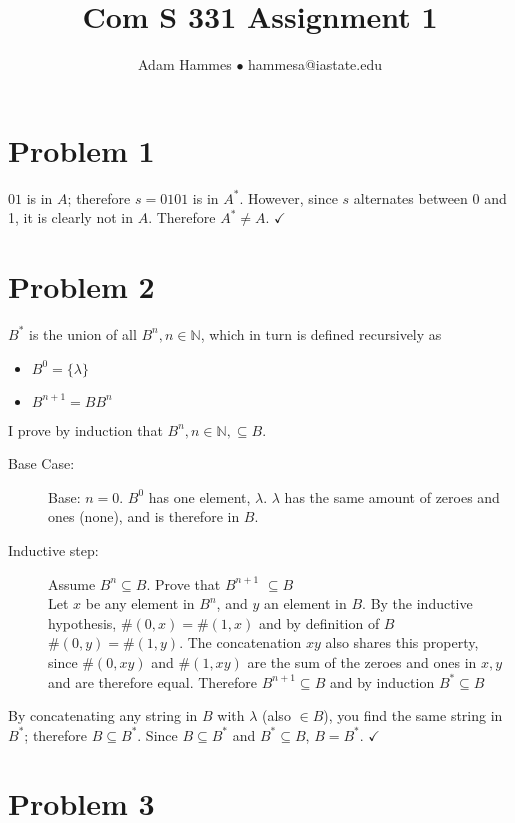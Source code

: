 \documentclass[11pt]{article}
\begin{document}
\title{Com S 331 Assignment 1}
\author{Adam Hammes $\bullet$ hammesa@iastate.edu}
\maketitle

\section*{Problem 1}

$01$ is in $A$; therefore $s = 0101$ is in $A^*$. However, since $s$ alternates between 0 and 1, it is clearly not in $A$. Therefore $A^* \neq A$. $\checkmark$

\section*{Problem 2}
$B^*$ is  the union of all $B^n, n \in \mathbb{N}$, which in turn is defined recursively as
	\begin{itemize}
		\item 		$B^0	= \{\lambda\}$
		\item		$B^{n+1}	 = BB^n$
	\end{itemize}
I prove by induction that $B^n, n \in \mathbb{N}, \subseteq B$.

\begin{description}
	\item[Base Case:] Base: $n = 0$. $B^0$ has one element, $\lambda$. $\lambda$ has the same amount of zeroes and ones (none), and is therefore in $B$.
	
	\item[Inductive step:] Assume $B^n \subseteq B$. Prove that $B^{n+1}$ $\subseteq B$\\
	Let $x$ be any element in $B^n$, and $y$ an element in $B$. By the inductive hypothesis, $\#(0,x) =\#(1,x)$ and by definition of $B$ $\#(0,y) = \#(1,y)$. The concatenation $xy$ also shares this property, since $\#(0,xy)$ and $\#(1, xy)$ are the sum of the zeroes and ones in $x,y$ and are therefore equal. Therefore $B^{n+1} \subseteq B$ and by induction $B^* \subseteq B$
\end{description}
By concatenating any string in $B$ with $\lambda$ (also $\in B$), you find the same string in $B^*$; therefore $B \subseteq B^*$. Since $B \subseteq B^*$ and $B^* \subseteq B$, $B = B^*$. $\checkmark$

\section*{Problem 3}
\end{document}
